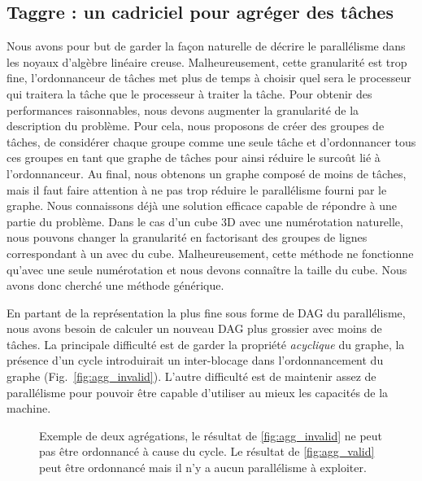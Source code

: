 \subsection{Taggre : un cadriciel pour agréger des tâches}
Nous avons pour but de garder la façon naturelle de décrire le parallélisme dans les noyaux d'algèbre linéaire creuse.
%
Malheureusement, cette granularité est trop fine, l'ordonnanceur de tâches met plus de temps à choisir quel sera le processeur qui traitera la tâche que le processeur à traiter la tâche.
%
Pour obtenir des performances raisonnables, nous devons augmenter la granularité de la description du problème.
%
Pour cela, nous proposons de créer des groupes de tâches, de considérer chaque groupe comme une seule tâche et d'ordonnancer tous ces groupes en tant que graphe de tâches pour ainsi réduire le surcoût lié à l'ordonnanceur.
%
Au final, nous obtenons un graphe composé de moins de tâches, mais il faut faire attention à ne pas trop réduire le parallélisme fourni par le graphe.
%
Nous connaissons déjà une solution efficace capable de répondre à une partie du problème.
%
Dans le cas d'un cube 3D avec une numérotation naturelle, nous pouvons changer la granularité en factorisant des groupes de lignes correspondant à un avec du cube.
%
Malheureusement, cette méthode ne fonctionne qu'avec une seule numérotation et nous devons connaître la taille du cube.
%
Nous avons donc cherché une méthode générique.




En partant de la représentation la plus fine sous forme de DAG du parallélisme, nous avons besoin de calculer un nouveau DAG plus grossier avec moins de tâches.
%
La principale difficulté est de garder la propriété {\em acyclique} du graphe, la présence d'un cycle introduirait un inter-blocage dans l'ordonnancement du graphe (Fig.~\ref{fig:agg_invalid}).
%
L'autre difficulté est de maintenir assez de parallélisme pour pouvoir être capable d'utiliser au mieux les capacités de la machine.

\begin{figure}[!ht]
     \begin{center}
        \hspace{0.15\textwidth}%
    \end{center}
    \caption{Exemple de deux agrégations, le résultat de \ref{fig:agg_invalid} ne peut pas être ordonnancé à cause du cycle. Le résultat de \ref{fig:agg_valid} peut être ordonnancé mais il n'y a aucun parallélisme à exploiter.}
    \label{fig:agg_basic}
\end{figure}

